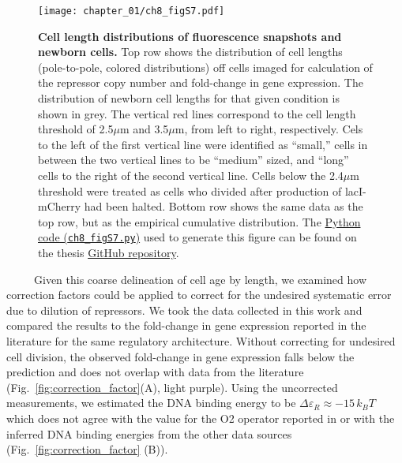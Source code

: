 \documentclass[12pt]{caltech_thesis}
\begin{document}
\hypertarget{fig:length_distributions}{%
\begin{figure}
\centering
\texttt{[image: chapter\_01/ch8\_figS7.pdf]}
\caption[{Cell length distributions of fluorescence snapshots and
newborn cells.}]{\textbf{Cell length distributions of fluorescence
snapshots and newborn cells.} Top row shows the distribution of cell
lengths (pole-to-pole, colored distributions) off cells imaged for
calculation of the repressor copy number and fold-change in gene
expression. The distribution of newborn cell lengths for that given
condition is shown in grey. The vertical red lines correspond to the
cell length threshold of 2.5\(\mu\)m and 3.5\(\mu\)m, from left to
right, respectively. Cels to the left of the first vertical line were
identified as ``small,'' cells in between the two vertical lines to be
``medium'' sized, and ``long'' cells to the right of the second vertical
line. Cells below the 2.4\(\mu\)m threshold were treated as cells who
divided after production of lacI-mCherry had been halted. Bottom row
shows the same data as the top row, but as the empirical cumulative
distribution. The
\href{https://github.com/gchure/phd/blob/master/src/chapter_08/code/ch8_figS7.py}{Python
code (\texttt{ch8\_figS7.py})} used to generate this figure can be found
on the thesis \href{https://github.com/gchure/phd}{GitHub repository}.}
\label{fig:length_distributions}
\end{figure}
}

~~~~~Given this coarse delineation of cell age by length, we examined
how correction factors could be applied to correct for the undesired
systematic error due to dilution of repressors. We took the data
collected in this work and compared the results to the fold-change in
gene expression reported in the literature for the same regulatory
architecture. Without correcting for undesired cell division, the
observed fold-change in gene expression falls below the prediction and
does not overlap with data from the literature
(Fig.~\ref{fig:correction_factor}(A), light purple). Using the
uncorrected measurements, we estimated the DNA binding energy to be
\(\Delta\varepsilon_R \approx -15\, k_BT\) which does not agree with the
value for the O2 operator reported in \textcite{garcia2011} or with the
inferred DNA binding energies from the other data sources
(Fig.~\ref{fig:correction_factor} (B)).
\end{document}
